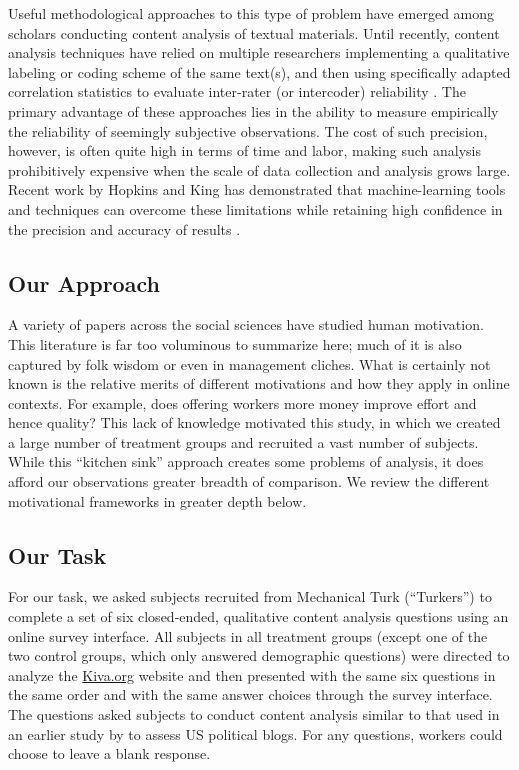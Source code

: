 \documentclass{cscw2010}
\begin{document}
Useful methodological approaches to this type of problem have emerged
among scholars conducting content analysis of textual materials. Until
recently, content analysis techniques have relied on multiple
researchers implementing a qualitative labeling or coding scheme of
the same text(s), and then using specifically adapted correlation
statistics to evaluate inter-rater (or intercoder) reliability
\cite{krippendorff_content_2003, cohen_coefficient_1960}. The primary
advantage of these approaches lies in the ability to measure
empirically the reliability of seemingly subjective observations. The
cost of such precision, however, is often quite high in terms of time
and labor, making such analysis prohibitively expensive when the scale
of data collection and analysis grows large. Recent work by Hopkins
and King has demonstrated that machine-learning tools and techniques
can overcome these limitations while retaining high
confidence in the precision and accuracy of results
\cite{Hopkins-King2010}.

\subsection{Our Approach} 
A variety of papers across the social sciences have studied
human motivation. This literature is far too voluminous to summarize
here; much of it is also captured by folk wisdom or even in management
cliches. What is certainly not known is the relative merits of
different motivations and how they apply in online contexts. For
example, does offering workers more money improve effort and hence
quality? This lack of knowledge motivated this study, in which we
created a large number of treatment groups and recruited a vast number
of subjects. While this ``kitchen sink'' approach creates some
problems of analysis, it does afford our observations greater breadth
of comparison. We review the different motivational frameworks in greater
depth below.

\subsection{Our Task}
For our task, we asked subjects recruited from Mechanical Turk (``Turkers'') to complete a set of six closed-ended,
qualitative content analysis questions using an online survey
interface. All subjects in all treatment groups (except one of the two
control groups, which only answered demographic questions) were
directed to analyze the \href{http://www.kiva.org}{Kiva.org} website and then presented with the same
six questions in the same order and with the same answer choices
through the survey interface. The questions asked subjects to conduct
content analysis similar to that used in an earlier study by
\cite{benklershaw2010} to assess US political blogs. For any
questions, workers could choose to leave a blank response.
\end{document}
